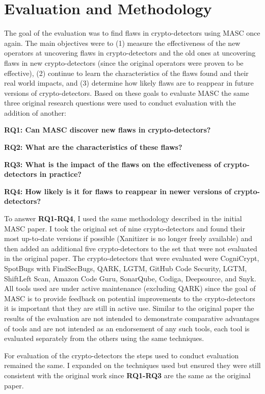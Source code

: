 \chapter{Evaluation and Methodology}
\label{chap_evaluation}

The goal of the evaluation was to find flaws in crypto-detectors using MASC once again. The main objectives were to (1) measure the effectiveness of the new operators at uncovering flaws in crypto-detectors and the old ones at uncovering flaws in new crypto-detectors (since the original operators were proven to be effective), (2) continue to learn the characteristics of the flaws found and their real world impacts, and (3) determine how likely flaws are to reappear in future versions of crypto-detectors. Based on these goals to evaluate MASC the same three original research questions were used to conduct evaluation with the addition of another:

\textbf{RQ1: Can MASC discover new flaws in crypto-detectors?}

\textbf{RQ2: What are the characteristics of these flaws?}

\textbf{RQ3: What is the impact of the flaws on the effectiveness of crypto-detectors in practice?}

\textbf{RQ4: How likely is it for flaws to reappear in newer versions of crypto-detectors?}

To answer \textbf{RQ1-RQ4}, I used the same methodology described in the initial MASC paper. I took the original set of nine crypto-detectors and found their most up-to-date versions if possible (Xanitizer is no longer freely available) and then added an additional five crypto-detectors to the set that were not evaluated in the original paper. The crypto-detectors that were evaluated were CogniCrypt, SpotBugs with FindSecBugs, QARK, LGTM, GitHub Code Security, LGTM, ShiftLeft Scan, Amazon Code Guru, SonarQube, Codiga, Deepsource, and Snyk. All tools used are under active maintenance (excluding QARK) since the goal of MASC is to provide feedback on potential improvements to the crypto-detectors it is important that they are still in active use. Similar to the original paper the results of the evaluation are not intended to demonstrate comparative advantages of tools and are not intended as an endorsement of any such tools, each tool is evaluated separately from the others using the same techniques.

For evaluation of the crypto-detectors the steps used to conduct evaluation remained the same. I expanded on the techniques used but ensured they were still consistent with the original work since \textbf{RQ1-RQ3} are the same as the original paper.

